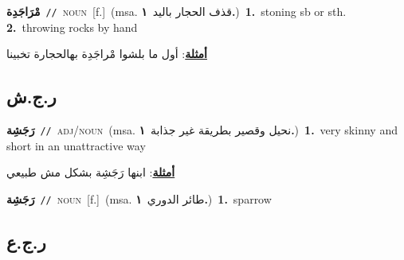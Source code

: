 \documentclass[10pt,a4paper,twoside]{article} %
\begin{document}
\begin{multicols}{2}
{\setlength\topsep{0pt}\textbf{\foreignlanguage{arabic}{مْرَاجَدِة}}\ {\color{gray}\texttt{//}\color{black}}\ \textsc{noun}\ [f.]\ \color{gray}(msa. \foreignlanguage{arabic}{قذف الحجار باليد}~\foreignlanguage{arabic}{\textbf{١.}})\color{black}\ \textbf{1.}~stoning sb or sth.  \textbf{2.}~throwing rocks by hand\  \begin{flushright}\color{gray}\foreignlanguage{arabic}{\textbf{\underline{\foreignlanguage{arabic}{أمثلة}}}: أول ما بلشوا مْراجَدِة بهالحجارة تخبينا}\end{flushright}\color{black}} \vspace{2mm}

\vspace{-3mm}
\subsection*{\color{blue}\foreignlanguage{arabic}{ر.ج.ش}\color{blue}{ (ntws)}} 

{\setlength\topsep{0pt}\textbf{\foreignlanguage{arabic}{رَجَشِة}}\ {\color{gray}\texttt{//}\color{black}}\ \textsc{adj/noun}\ \color{gray}(msa. \foreignlanguage{arabic}{نحيل وقصير بطريقة غير جذابة}~\foreignlanguage{arabic}{\textbf{١.}})\color{black}\ \textbf{1.}~very skinny and short in an unattractive way\  \begin{flushright}\color{gray}\foreignlanguage{arabic}{\textbf{\underline{\foreignlanguage{arabic}{أمثلة}}}: ابنها رَجَشِة بشكل مش طبيعي}\end{flushright}\color{black}} \vspace{2mm}

{\setlength\topsep{0pt}\textbf{\foreignlanguage{arabic}{رَجَشِة}}\ {\color{gray}\texttt{//}\color{black}}\ \textsc{noun}\ [f.]\ \color{gray}(msa. \foreignlanguage{arabic}{طائر الدوري}~\foreignlanguage{arabic}{\textbf{١.}})\color{black}\ \textbf{1.}~sparrow\ } \vspace{2mm}

\vspace{-3mm}
\subsection*{\color{blue}\foreignlanguage{arabic}{ر.ج.ع}\color{blue}{}} 


\end{multicols}
\end{document}
